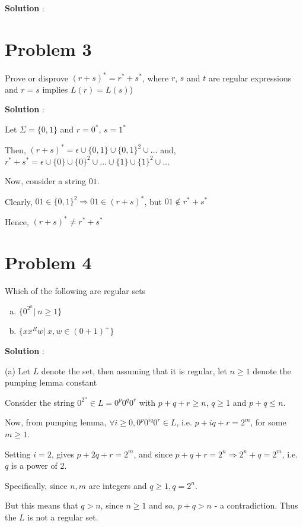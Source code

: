 \documentclass{article}
\begin{document}
    \textbf{Solution} : 
    
    
    \section*{Problem 3} Prove or disprove $(r+s)^* = r^* + s^*$, where $r$, $s$ and $t$ are regular expressions and $r=s$ implies $L(r)=L(s)$)
    
    \textbf{Solution} :
    
    Let $\Sigma = \{0, 1 \}$ and $r = 0^*$, $s = 1^*$
    
    Then, $(r + s)^* = \epsilon \cup \{ 0, 1 \} \cup \{ 0, 1 \}^2 \cup \dots$
    and, $r^* + s^* = \epsilon \cup \{ 0\} \cup \{ 0 \}^2 \cup \dots \cup \{ 1\} \cup \{ 1 \}^2 \cup \dots$
    
    Now, consider a string $01$.
    
    Clearly, $01 \in \{0, 1 \}^2 \Rightarrow 01 \in (r + s)^*$, but $01 \notin r^* + s^*$
 
    Hence, $(r+s)^* \neq  r^* + s^*$
    
    
    \section*{Problem 4} Which of the following are regular sets
    \begin{enumerate}[(a)]
        \item $\{ 0^{2^n} |~ n \geq 1\}$
        \item $\{ xx^Rw |~ x, w \in (0 + 1)^+ \}$
    \end{enumerate}
    
    \textbf{Solution} : 

    (a) Let $L$ denote the set, then assuming that it is regular, let $n \geq 1$ denote the pumping lemma constant

    \quad Consider the string $0^{2^n} \in L = 0^{p}0^{q}0^{r}$ with $p + q + r \geq n$, $q \geq 1$ and $p + q \leq n$. 
    
    \quad Now, from pumping lemma, $\forall i \geq 0,0 ^{p}0^{iq}0^{r} \in L$, i.e. $p + iq + r = 2^m$, for some $m \geq 1$. 
    
    \quad Setting $i = 2$, gives $p + 2q + r = 2^m$, and since $p + q + r = 2^n \Rightarrow 2^n + q = 2^m$, i.e. $q$ is a power of 2. 
    
    \quad Specifically, since $n, m$ are integers and $q \geq 1, q = 2^n$.
    
    \quad But this means that $q > n$, since $n \geq 1$
    and so, $p + q > n$  - a contradiction. Thus the $L$ is not a regular set.
    
\end{document}

